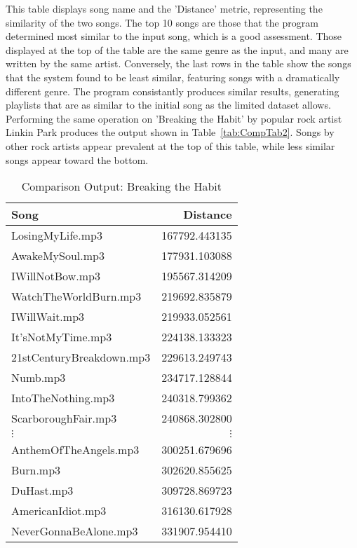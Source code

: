 \documentclass[conference]{IEEEtran}
\begin{document}
This table displays song name and the 'Distance' metric, representing the similarity of the two songs. The top 10 songs are those that the program determined most similar to the input song, which is a good assessment. Those displayed at the top of the table are the same genre as the input, and many are written by the same artist. Conversely, the last rows in the table show the songs that the system found to be least similar, featuring songs with a dramatically different genre. The program consistantly produces similar results, generating playlists that are as similar to the initial song as the limited dataset allows. Performing the same operation on 'Breaking the Habit' by popular rock artist Linkin Park produces the output shown in Table~\eqref{tab:CompTab2}. Songs by other rock artists appear prevalent at the top of this table, while less similar songs appear toward the bottom. 
\begin{table}[htbp]
  \centering
  \caption{Comparison Output: Breaking the Habit}\label{tab:CompTab2}
  \begin{tabular}{lr}
    \toprule
    \textbf{Song} & \textbf{Distance} \\
    \midrule
    LosingMyLife.mp3 & 167792.443135 \\
    AwakeMySoul.mp3 & 177931.103088 \\
    IWillNotBow.mp3 & 195567.314209 \\
    WatchTheWorldBurn.mp3 & 219692.835879 \\
    IWillWait.mp3 & 219933.052561 \\
    It'sNotMyTime.mp3 & 224138.133323 \\
    21stCenturyBreakdown.mp3 & 229613.249743 \\
    Numb.mp3 & 234717.128844 \\
    IntoTheNothing.mp3 & 240318.799362 \\
    ScarboroughFair.mp3 & 240868.302800 \\
    \midrule
    $\vdots$ & $\vdots$ \\
    \midrule
    AnthemOfTheAngels.mp3 & 300251.679696 \\
    Burn.mp3 & 302620.855625 \\
    DuHast.mp3 & 309728.869723 \\
    AmericanIdiot.mp3 & 316130.617928 \\
    NeverGonnaBeAlone.mp3 & 331907.954410 \\
    \bottomrule
  \end{tabular}
\end{table}
\end{document}
